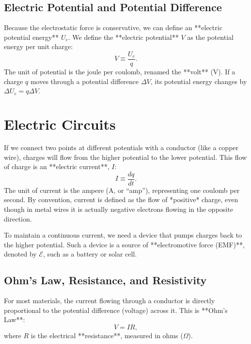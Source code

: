 \subsection{Electric Potential and Potential Difference}

Because the electrostatic force is conservative, we can define an **electric potential energy** $U_e$. We define the **electric potential** $V$ as the potential energy per unit charge:
\begin{equation}
    V \equiv \frac{U_e}{q}.
\end{equation}
The unit of potential is the joule per coulomb, renamed the **volt** (\si{V}). If a charge $q$ moves through a potential difference $\Delta V$, its potential energy changes by $\Delta U_e = q \Delta V$. 

\section{Electric Circuits}

If we connect two points at different potentials with a conductor (like a copper wire), charges will flow from the higher potential to the lower potential. This flow of charge is an **electric current**, $I$:
\begin{equation}
    I \equiv \frac{dq}{dt}.
\end{equation}
The unit of current is the ampere (\si{A}, or ``amp''), representing one coulomb per second. By convention, current is defined as the flow of *positive* charge, even though in metal wires it is actually negative electrons flowing in the opposite direction.

To maintain a continuous current, we need a device that pumps charges back to the higher potential. Such a device is a source of **electromotive force (EMF)**, denoted by $\mathcal{E}$, such as a battery or solar cell.

\subsection{Ohm's Law, Resistance, and Resistivity}

For most materials, the current flowing through a conductor is directly proportional to the potential difference (voltage) across it. This is **Ohm's Law**:
\begin{equation}
    V = I R,
\end{equation}
where $R$ is the electrical **resistance**, measured in ohms ($\Omega$). 

